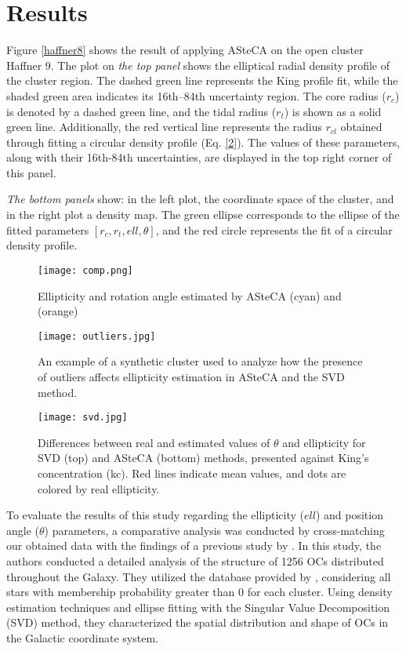 \documentclass[baaa]{baaa}
\begin{document}
\section{Results}


Figure \ref{haffner8} shows the result of applying ASteCA on the open cluster Haffner 9. The plot on \emph{the top panel} shows the elliptical radial density profile of the cluster region. The dashed green line represents the King profile fit, while the shaded green area indicates its 16th–84th uncertainty region. The core radius ($r_c$) is denoted by a dashed green line, and the tidal radius ($r_t$) is shown as a solid green line. Additionally, the red vertical line represents the radius $r_{cl}$ obtained through fitting a circular density profile (Eq. \ref{2}). The values of these parameters, along with their 16th-84th uncertainties, are displayed in the top right corner of this panel.


\emph{The bottom panels} show: in the left plot, the coordinate space of the cluster, and in the right plot a density map. The green ellipse corresponds to the ellipse of the fitted parameters $[r_c, r_t, ell, \theta]$, and the red circle represents the fit of a circular density profile.
\begin{figure}
    \centering
    \texttt{[image: comp.png]}
    \caption{Ellipticity and rotation angle estimated by ASteCA (cyan) and \cite{2021A&A...656A..49H} (orange)}
    \label{comp}
\end{figure}


\begin{figure}[h!]
    \centering
    \texttt{[image: outliers.jpg]}
    \caption{An example of a synthetic cluster used to analyze how the presence of outliers affects ellipticity estimation in ASteCA and the SVD method. }
    \label{out}
\end{figure}

\begin{figure*}[ht!]
    \centering
    \texttt{[image: svd.jpg]}
    \caption{Differences between real and estimated values of $\theta$ and ellipticity for SVD (top) and ASteCA (bottom) methods, presented against King’s concentration (kc). Red lines indicate mean values, and dots are colored by real ellipticity.}
    \label{svd}
\end{figure*}

To evaluate the results of this study regarding the ellipticity ($ell$) and position angle ($\theta$) parameters, a comparative analysis was conducted by cross-matching our obtained data with the findings of a previous study by \cite{2021A&A...656A..49H}. In this study, the authors conducted a detailed analysis of the structure of 1256 OCs distributed throughout the Galaxy. They utilized the database provided by \cite{Cantat-Gaudin_2020}, considering all stars with membership probability greater than 0 for each cluster. Using density estimation techniques and ellipse fitting with the Singular Value Decomposition (SVD) method, they characterized the spatial distribution and shape of OCs in the Galactic coordinate system.
\end{document}
